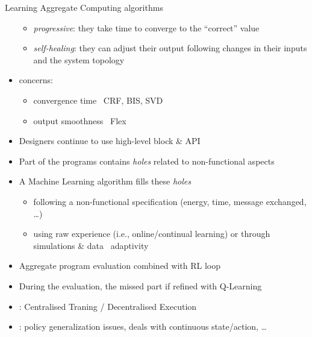 \documentclass[8pt, aspectratio=169, handout]{beamer}
\begin{document}
\begin{frame}[allowframebreaks]{Learning Aggregate Computing algorithms}
\begin{card}
\begin{itemize}
      \begin{itemize}
        \item \emph{progressive}: they take time  to converge to the ``correct'' value
        \item \emph{self-healing}: they can adjust their output following changes in
        their inputs and the system topology
      \end{itemize}
      \item {} concerns:
      \begin{itemize}
        \item convergence time \faArrowRight \, CRF, BIS, SVD~\cite{audrito2017ult}
        \item output smoothness \faArrowRight \, Flex~\cite{audrito2017ult}
      \end{itemize}
    \end{itemize}
  \end{card}
  \begin{card}
    \begin{itemize}
      \item Designers continue to use high-level block \& API
      \item Part of the programs contains \emph{holes} related to non-functional aspects
      \item A Machine Learning algorithm fills these \emph{holes}
      \begin{itemize}
        \item following a non-functional specification (energy, time, message exchanged, \dots)
        \item using raw experience (i.e., online/continual learning) or through simulations \& data \faArrowRight \, adaptivity
      \end{itemize}
    \end{itemize}
  \end{card}
  \framebreak
  \begin{card}
    \begin{itemize}
      \item Aggregate program evaluation combined with RL loop
      \item During the evaluation, the missed part if refined with Q-Learning
      \item {}: Centralised Traning / Decentralised Execution
      \item {}: policy generalization issues, deals with continuous state/action, \dots
    \end{itemize}
  \end{card}
  \centering
\end{frame}
\end{document}
